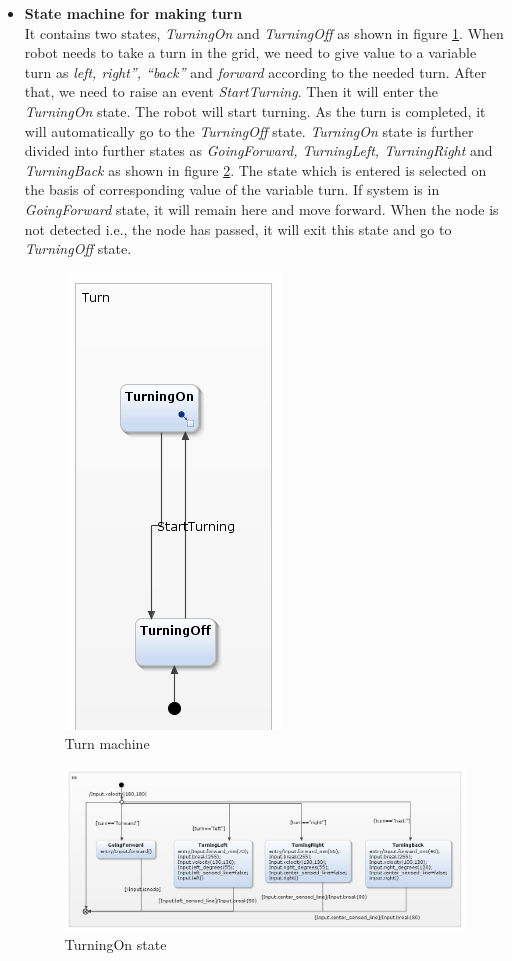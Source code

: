 \documentclass[a4paper,12pt,oneside]{book}
\begin{document}
\begin{itemize}
\item \textbf{State machine for making turn}\\
It contains two states, \textit{TurningOn} and \textit{TurningOff} as shown in figure \ref{turn}. When robot needs to take a turn in the grid, we need to give value to a variable turn as \textit{left, right”, “back”} and \textit{forward} according to the needed turn. After that, we need to raise an event \textit{StartTurning}. Then it will enter the \textit{TurningOn} state. The robot will start turning. As the turn is completed, it will automatically go to the \textit{TurningOff} state.
\textit{TurningOn} state is further divided into further states as \textit{GoingForward, TurningLeft, TurningRight} and \textit{TurningBack} as shown in figure \ref{turning_on}.
The state which is entered is selected on the basis of corresponding value of the variable turn.
If system is in \textit{GoingForward} state, it will remain here and move forward. When the node is not detected i.e., the node has passed, it will exit this state and go to \textit{TurningOff} state.
	\begin{figure}[!htbp]
	\centering
	\includegraphics[scale=.6]{turn.png}
	\caption{Turn machine}
	\label{turn}
\end{figure}
\begin{figure}[!htbp]
	\centering
	\includegraphics[scale=.65]{turning_on.png}
	\caption{TurningOn state}
	\label{turning_on}
\end{figure}


\end{itemize}
\end{document}

